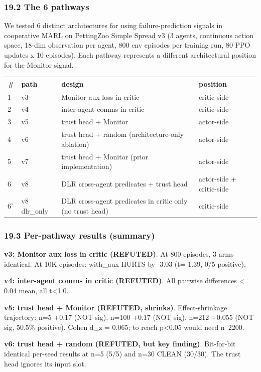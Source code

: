 \documentclass[11pt]{article}
\begin{document}
\subsubsection{19.2 The 6 pathways}

We tested 6 distinct architectures for using failure-prediction
signals in cooperative MARL on PettingZoo Simple Spread v3
(3 agents, continuous action space, 18-dim observation per
agent, 800 env episodes per training run, 80 PPO updates x 10
episodes). Each pathway represents a different architectural
position for the Monitor signal.

\begin{tabular}{llll}
\# & path & design & position \\
\hline
1 & v3 & Monitor aux loss in critic & critic-side \\
2 & v4 & inter-agent comms in critic & critic-side \\
3 & v5 & trust head + Monitor & actor-side \\
4 & v6 & trust head + random (architecture-only ablation) & actor-side \\
5 & v7 & trust head + Monitor (prior implementation) & actor-side \\
6 & v8 & DLR cross-agent predicates + trust head & actor-side + critic-side \\
6' & v8 dlr\_only & DLR cross-agent predicates in critic only (no trust head) & critic-side \\
\end{tabular}


\subsubsection{19.3 Per-pathway results (summary)}

\textbf{v3: Monitor aux loss in critic (REFUTED)}. At 800 episodes,
3 arms identical. At 10K episodes: with\_aux HURTS by -3.03
(t=-1.39, 0/5 positive).

\textbf{v4: inter-agent comms in critic (REFUTED)}. All pairwise
differences < 0.04 mean, all t<1.0.

\textbf{v5: trust head + Monitor (REFUTED, shrinks)}. Effect-shrinkage
trajectory: n=5 +0.17 (NOT sig), n=100 +0.17 (NOT sig),
n=212 +0.055 (NOT sig, 50.5\% positive). Cohen d\_z = 0.065;
to reach p<0.05 would need n~2200.

\textbf{v6: trust head + random (REFUTED, but key finding)}.
Bit-for-bit identical per-seed results at n=5 (5/5) and
n=30 CLEAN (30/30). The trust head ignores its input slot.
\end{document}
